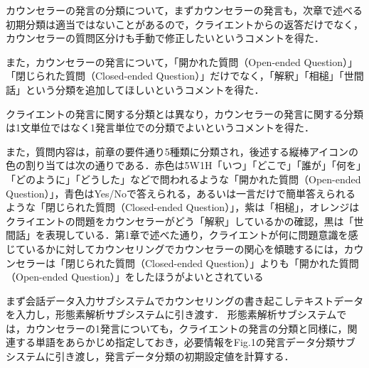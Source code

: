 \documentclass[shuuron]{kuee}
\begin{document}
カウンセラーの発言の分類について，まずカウンセラーの発言も，次章で述べる初期分類は適当ではないことがあるので，クライエントからの返答だけでなく，カウンセラーの質問区分けも手動で修正したいというコメントを得た．

また，カウンセラーの発言について，「開かれた質問（Open-ended Question）」「閉じられた質問（Closed-ended Question）」だけでなく，「解釈」「相槌」「世間話」という分類を追加してほしいというコメントを得た．

クライエントの発言に関する分類とは異なり，カウンセラーの発言に関する分類は1文単位ではなく1発言単位での分類でよいというコメントを得た．

また，質問内容は，前章の要件通り5種類に分類され，後述する縦棒アイコンの色の割り当ては次の通りである．赤色は5W1H「いつ」「どこで」「誰が」「何を」「どのように」「どうした」などで問われるような「開かれた質問（Open-ended Question）」，青色はYes/Noで答えられる，あるいは一言だけで簡単答えられるような「閉じられた質問（Closed-ended Question）」，紫は「相槌」，オレンジはクライエントの問題をカウンセラーがどう「解釈」しているかの確認，黒は「世間話」を表現している．第1章で述べた通り，クライエントが何に問題意識を感じているかに対してカウンセリングでカウンセラーの関心を傾聴するには，カウンセラーは「閉じられた質問（Closed-ended Question）」よりも「開かれた質問（Open-ended Question）」をしたほうがよいとされている

まず会話データ入力サブシステムでカウンセリングの書き起こしテキストデータを入力し，形態素解析サブシステムに引き渡す．
形態素解析サブシステムでは，カウンセラーの1発言についても，クライエントの発言の分類と同様に，関連する単語をあらかじめ指定しておき，必要情報をFig.1の発言データ分類サブシステムに引き渡し，発言データ分類の初期設定値を計算する．
\end{document}
